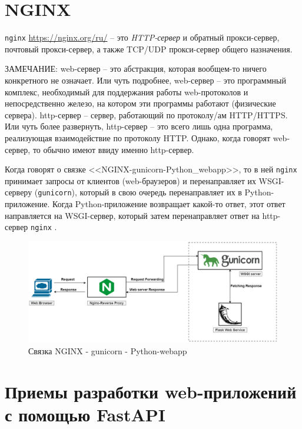 \documentclass[%
	11pt,
	a4paper,
	utf8,
		]{article}
\begin{document}
\section{NGINX}

\texttt{nginx} \url{https://nginx.org/ru/} -- это \emph{HTTP-сервер} и обратный прокси-сервер, почтовый прокси-сервер, а также TCP/UDP прокси-сервер общего назначения.

ЗАМЕЧАНИЕ: web-сервер -- это абстракция, которая вообщем-то ничего конкретного не означает. Или чуть подробнее, web-сервер -- это программный комплекс, необходимый для поддержания работы web-протоколов и непосредственно железо, на котором эти программы работают (физические сервера). http-сервер -- сервер, работающий по протоколу/ам HTTP/HTTPS. Или чуть более развернуть, http-сервер -- это всего лишь одна программа, реализующая взаимодействие по протоколу HTTP. Однако, когда говорят web-сервер, то обычно имеют ввиду именно http-сервер.

Когда говорят о связке <<NGINX-gunicorn-Python\_webapp>>, то в ней \texttt{nginx} принимает запросы от клиентов (web-браузеров) и перенаправляет их WSGI-серверу (\texttt{gunicorn}), который в свою очередь перенаправляет их в Python-приложение. Когда Python-приложение возвращает какой-то ответ, этот ответ направляется на WSGI-сервер, который затем перенаправляет ответ на http-сервер \texttt{nginx} .

\begin{figure}[h]
	\centering
	\includegraphics[scale=0.35]{figures/nginx_gunicorn_pythonapp.png}
	\caption{ Связка NGINX - gunicorn - Python-webapp}\label{fig:nginx_gunicron_pythonapp}
\end{figure}



\section{Приемы разработки web-приложений с помощью FastAPI}
\end{document}
